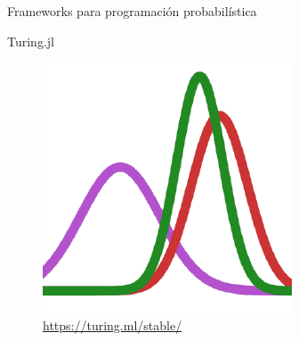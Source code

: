 \documentclass[11pt]{beamer}
\begin{document}
\begin{frame}{Frameworks para programación probabilística}
\begin{figure}%
 \qquad
    \label{fig:example}%
\end{figure}
\end{frame}

\begin{frame}{Turing.jl }
	\begin{figure}
		\includegraphics[scale=0.4]{images/turing}
		\caption{\url{https://turing.ml/stable/}}
	\end{figure}
\end{frame}
\end{document}
